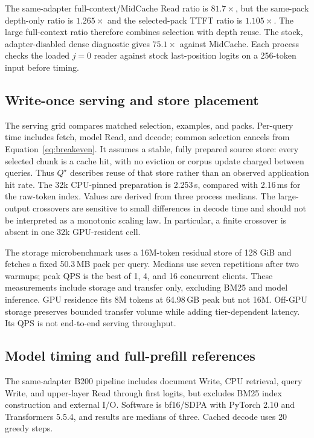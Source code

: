 The same-adapter full-context/MidCache Read ratio is $81.7\times$, but the same-pack depth-only ratio is $1.265\times$ and the selected-pack TTFT ratio is $1.105\times$. The large full-context ratio therefore combines selection with depth reuse. The stock, adapter-disabled dense diagnostic gives $75.1\times$ against MidCache. Each process checks the loaded $j=0$ reader against stock last-position logits on a 256-token input before timing.

\subsection{Write-once serving and store placement}

The serving grid compares matched selection, examples, and packs. Per-query time includes fetch, model Read, and decode; common selection cancels from Equation~\ref{eq:breakeven}. It assumes a stable, fully prepared source store: every selected chunk is a cache hit, with no eviction or corpus update charged between queries. Thus $Q^\star$ describes reuse of that store rather than an observed application hit rate. The 32k CPU-pinned preparation is 2.253\,s, compared with 2.16\,ms for the raw-token index. Values are derived from three process medians. The large-output crossovers are sensitive to small differences in decode time and should not be interpreted as a monotonic scaling law. In particular, a finite crossover is absent in one 32k GPU-resident cell.


The storage microbenchmark uses a 16M-token residual store of 128 GiB and fetches a fixed 50.3\,MB pack per query. Medians use seven repetitions after two warmups; peak QPS is the best of 1, 4, and 16 concurrent clients. These measurements include storage and transfer only, excluding BM25 and model inference. GPU residence fits 8M tokens at 64.98\,GB peak but not 16M. Off-GPU storage preserves bounded transfer volume while adding tier-dependent latency. Its QPS is not end-to-end serving throughput.

\subsection{Model timing and full-prefill references}

The same-adapter B200 pipeline includes document Write, CPU retrieval, query Write, and upper-layer Read through first logits, but excludes BM25 index construction and external I/O. Software is bf16/SDPA with PyTorch 2.10 and Transformers 5.5.4, and results are medians of three. Cached decode uses 20 greedy steps.

